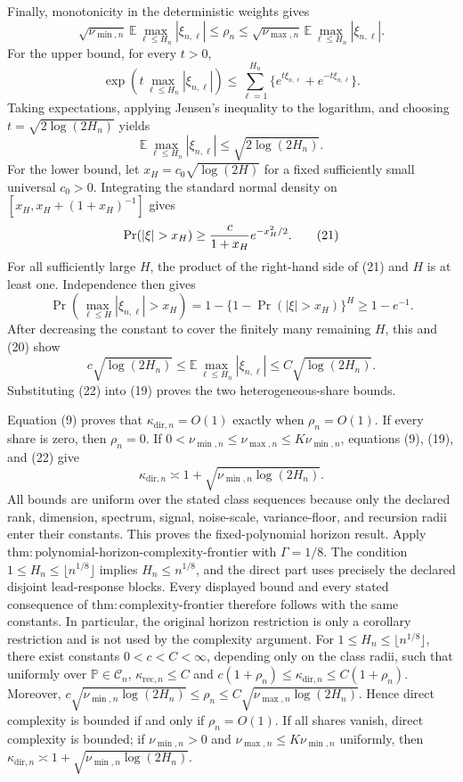 Finally, monotonicity in the deterministic weights gives
\[
 \sqrt{\nu_{\min,n}}\,
 \mathbb E\max_{\ell\le H_n}|\xi_{n,\ell}|
 \le\rho_n\le
 \sqrt{\nu_{\max,n}}\,
 \mathbb E\max_{\ell\le H_n}|\xi_{n,\ell}|.
 \tag{19}
\]
For the upper bound, for every \(t>0\),
\[
 \exp\!\left(t\max_{\ell\le H_n}|\xi_{n,\ell}|\right)
 \le\sum_{\ell=1}^{H_n}
 \{e^{t\xi_{n,\ell}}+e^{-t\xi_{n,\ell}}\}.
\]
Taking expectations, applying Jensen's inequality to the logarithm, and choosing
\(t=\sqrt{2\log(2H_n)}\) yields
\[
 \mathbb E\max_{\ell\le H_n}|\xi_{n,\ell}|
 \le\sqrt{2\log(2H_n)}.
 \tag{20}
\]
For the lower bound, let \(x_H=c_0\sqrt{\log(2H)}\) for a fixed sufficiently small universal \(c_0>0\).  Integrating the standard normal density on
\([x_H,x_H+(1+x_H)^{-1}]\) gives
\[
 \Pr(|\xi|>x_H)
 \ge {c\over1+x_H}e^{-x_H^2/2}.
 \tag{21}
\]
For all sufficiently large \(H\), the product of the right-hand side of (21) and \(H\) is at least one.  Independence then gives
\[
 \Pr\!\left(\max_{\ell\le H}|\xi_{n,\ell}|>x_H\right)
 =1-\{1-\Pr(|\xi|>x_H)\}^{H}
 \ge1-e^{-1}.
\]
After decreasing the constant to cover the finitely many remaining \(H\), this and (20) show
\[
 c\sqrt{\log(2H_n)}
 \le\mathbb E\max_{\ell\le H_n}|\xi_{n,\ell}|
 \le C\sqrt{\log(2H_n)}.
 \tag{22}
\]
Substituting (22) into (19) proves the two heterogeneous-share bounds.

Equation (9) proves that \(\kappa_{\mathrm{dir},n}=O(1)\) exactly when \(\rho_n=O(1)\).  If every share is zero, then \(\rho_n=0\).  If
\(0<\nu_{\min,n}\le\nu_{\max,n}\le K\nu_{\min,n}\), equations (9), (19), and (22) give
\[
 \kappa_{\mathrm{dir},n}\asymp
 1+\sqrt{\nu_{\min,n}\log(2H_n)}.
\]
All bounds are uniform over the stated class sequences because only the declared rank, dimension, spectrum, signal, noise-scale, variance-floor, and recursion radii enter their constants.  This proves the fixed-polynomial horizon result.
Apply \(\mathrm{thm{:}polynomial\mbox{-}horizon\mbox{-}complexity\mbox{-}frontier}\) with \(\Gamma=1/8\).  The condition \(1\le H_n\le\lfloor n^{1/8}\rfloor\) implies \(H_n\le n^{1/8}\), and the direct part uses precisely the declared disjoint lead-response blocks.  Every displayed bound and every stated consequence of \(\mathrm{thm{:}complexity\mbox{-}frontier}\) therefore follows with the same constants.  In particular, the original horizon restriction is only a corollary restriction and is not used by the complexity argument.
For \(1\le H_n\le\lfloor n^{1/8}\rfloor\), there exist constants \(0<c<C<\infty\), depending only on the class radii, such that uniformly over \(\mathbb P\in\mathcal C_n\), \(\kappa_{\mathrm{rec},n}\le C\) and \(c(1+\rho_n)\le\kappa_{\mathrm{dir},n}\le C(1+\rho_n)\). Moreover, \(c\sqrt{\nu_{\min,n}\log(2H_n)}\le\rho_n\le C\sqrt{\nu_{\max,n}\log(2H_n)}\). Hence direct complexity is bounded if and only if \(\rho_n=O(1)\). If all shares vanish, direct complexity is bounded; if \(\nu_{\min,n}>0\) and \(\nu_{\max,n}\le K\nu_{\min,n}\) uniformly, then \(\kappa_{\mathrm{dir},n}\asymp1+\sqrt{\nu_{\min,n}\log(2H_n)}\).
